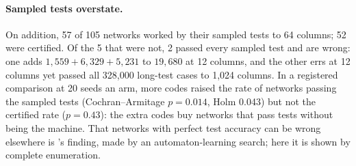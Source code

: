 \documentclass[11pt]{article}
\newcommand{\pn}[2]{#2}
\begin{document}
\paragraph{Sampled tests overstate.} On addition, \pn{addition.working}{57} of \pn{addition.networks}{105}
networks worked by their sampled tests to 64 columns; \pn{addition.certified}{52} were certified.
Of the \pn{addition.working-uncertified}{5} that were not, \pn{addition.wrong-passing}{2} passed every
sampled test and are wrong: one adds
$\pn{addition.counterexample}{1{,}559 + 6{,}329 + 5{,}231}$ to
$\pn{addition.counterexample-answer}{19{,}680}$ at \pn{addition.counterexample-columns}{12} columns,
and the other errs at \pn{addition.counterexample-other-columns}{12} columns yet passed all
\pn{addition.long-each}{328{,}000} long-test cases to 1{,}024 columns. In a registered comparison at
\pn{addition.codes-seeds}{20} seeds an arm, more codes raised the rate of networks passing the
sampled tests (Cochran--Armitage $p = \pn{addition.codes-working-p}{0.014}$, Holm
\pn{addition.codes-working-holm}{0.043}) but not the certified rate
($p = \pn{addition.codes-certified-p}{0.43}$): the extra codes buy networks that pass tests
without being the machine. That networks with perfect test accuracy can be wrong elsewhere is
\citet{weiss-2018-extracting-automata-queries-counterexamples}'s finding, made by an
automaton-learning search; here it is shown by complete enumeration.
\end{document}
